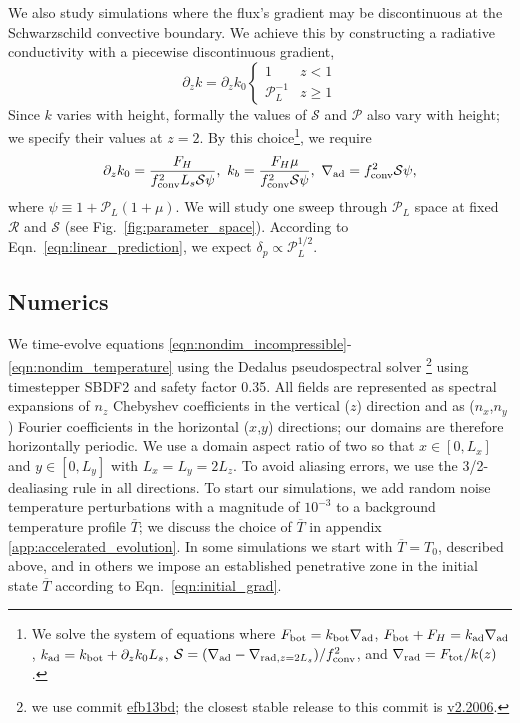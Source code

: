 \documentclass[twocolumn]{aastex631}
\newcommand{\gradrad}{\ensuremath{\nabla_{\rm{rad}}}}
\newcommand{\gradad}{\ensuremath{\nabla_{\rm{ad}}}}
\newcommand{\justgrad}{\ensuremath{\nabla}}
\newcommand{\mP}{\ensuremath{\mathcal{P}}}
\newcommand{\mR}{\ensuremath{\mathcal{R}}}
\newcommand{\mS}{\ensuremath{\mathcal{S}}}
\renewcommand{\bar}[1]{\overline{#1}}
\begin{document}
We also study simulations where the flux's gradient may be discontinuous at the Schwarzschild convective boundary.
We achieve this by constructing a radiative conductivity with a piecewise discontinuous gradient,
\begin{equation}
\partial_z k = \partial_z k_0
\begin{cases}
1	&	z < 1 \\
\mP_L^{-1} &	z \geq 1
\end{cases}
\label{eqn:sim_linear_k}
\end{equation}
Since $k$ varies with height, formally the values of $\mS$ and $\mP$ also vary with height; we specify their values at $z = 2$.
By this choice\footnote{
We solve the system of equations where ${F_{\rm{bot}} = k_{\rm{bot}}\gradad}$, ${F_{\rm{bot}} + F_H = k_{\rm{ad}}\gradad}$, ${k_{\rm{ad}} = k_{\rm{bot}} + \partial_z k_0 L_s}$, ${\mS = (\gradad - \justgrad_{\mathrm{rad},z=2L_s})/f_{\rm{conv}}^2}$, and ${\gradrad = F_{\rm{tot}}/k(z)}$.
}, we require
\begin{equation}
\partial_z k_0 = \frac{F_{H}}{f_{\rm{conv}}^2L_s \mS \psi},\,\,
k_b = \frac{F_H \mu}{f_{\rm{conv}}^2\mS\psi},\,\,
\gradad = f_{\rm{conv}}^2 \mS \psi,
\end{equation}
where $\psi \equiv 1 + \mP_L(1 + \mu)$.
We will study one sweep through $\mP_L$ space at fixed $\mR$ and $\mS$ (see Fig.~\ref{fig:parameter_space}).
According to Eqn.~\ref{eqn:linear_prediction}, we expect $\delta_p \propto \mP_L^{1/2}$.

\subsection{Numerics}
\label{sct:numerics}
We time-evolve equations \ref{eqn:nondim_incompressible}-\ref{eqn:nondim_temperature} using the Dedalus pseudospectral solver \citep{burns_etal_2020}\footnote{we use commit \href{https://github.com/DedalusProject/dedalus/commit/efb13bdaa09816dde3eee897bc2a15fc284ea2f1}{efb13bd}; the closest stable release to this commit is \href{https://github.com/DedalusProject/dedalus/releases/tag/v2.2006}{v2.2006}.} using timestepper SBDF2 \citep{wang&ruuth2008} and safety factor 0.35.
All fields are represented as spectral expansions of $n_z$ Chebyshev coefficients in the vertical ($z$) direction and as ($n_x$,$n_y$) Fourier coefficients in the horizontal ($x$,$y$) directions; our domains are therefore horizontally periodic.
We use a domain aspect ratio of two so that $x \in [0, L_x]$ and $y \in [0, L_y]$ with $L_x = L_y = 2 L_z$.
To avoid aliasing errors, we use the 3/2-dealiasing rule in all directions.
To start our simulations, we add random noise temperature perturbations with a magnitude of $10^{-3}$ to a background temperature profile $\overline{T}$; we discuss the choice of $\overline{T}$ in appendix \ref{app:accelerated_evolution}.
In some simulations we start with $\bar{T} = T_0$, described above, and in others we impose an established penetrative zone in the initial state $\bar{T}$ according to Eqn.~\ref{eqn:initial_grad}.
\end{document}
